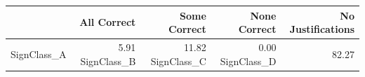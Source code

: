 \begin{tabular}{lrrrr}
\toprule
 & All Correct & Some Correct & None Correct & No Justifications \\
\midrule
SignClass_A & 5.91%
SignClass_B & 11.82%
SignClass_C & 0.00%
SignClass_D & 82.27%
\bottomrule
\end{tabular}
